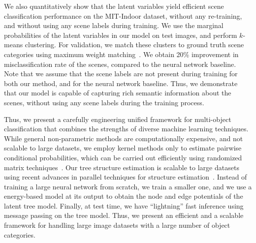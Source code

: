\documentclass{article}
\begin{document}
We also  quantitatively show that the latent variables yield efficient scene classification performance on the  MIT-Indoor dataset, without any re-training, and without using any scene labels during   training. We use the marginal probabilities  of the latent variables in our model on   test images, and perform $k$-means clustering. For validation, we match these clusters to ground truth scene categories using maximum weight matching~\cite{ahuja1989network}. We obtain 20\% improvement in misclassification rate of the scenes, compared to the neural network baseline. Note that we assume that the scene labels are not present during training for both our method, and for the neural network baseline. Thus, we demonstrate that our model is capable of capturing rich semantic information about the scenes, without using any scene labels during the training process.

Thus, we present a carefully engineering unified framework for multi-object classification that combines the strengths of diverse machine learning techniques. While general non-parametric methods are computationally expensive, and not scalable to large datasets, we employ kernel methods only to estimate pairwise conditional probabilities, which can be carried out efficiently using randomized matrix techniques~\cite{nystorm}. Our tree structure estimation is scalable to large datasets using recent advances in parallel techniques for structure estimation~\cite{scalableLTM}. Instead of training a large neural network from scratch, we train a smaller one, and we use a energy-based model at its output to  obtain the node and edge potentials of the latent tree model. Finally, at test time, we have ``lightning'' fast inference using message passing on the tree model. Thus, we present an efficient and  a scalable framework for handling large image datasets with a large number of object categories.


\end{document}
